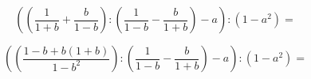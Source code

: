 \documentclass[12pt]{article}
\begin{document}
$$
\left( \left( \frac{1}{1+b} + \frac{b}{1-b} \right):\left( \frac{1}{1-b} - \frac{b}{1+b}\right) -a \right): (1-a^2)=
$$

$$
\left( \left( \frac{1-b +b(1+b)}{1-b^2} \right):\left( \frac{1}{1-b} - \frac{b}{1+b}\right) -a \right): (1-a^2)=
$$
\end{document}
